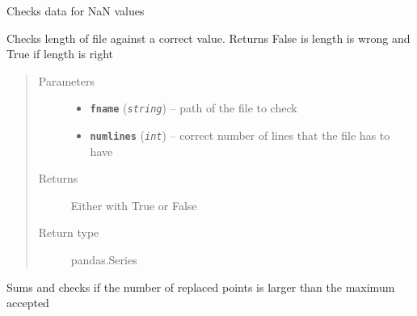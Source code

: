 \documentclass[a4paper,10pt,oneside]{sphinxmanual}
\begin{document}

\begin{fulllineitems}
\label{pymicra:pymicra.tests.check_nans}
Checks data for NaN values

\end{fulllineitems}


\begin{fulllineitems}
\label{pymicra:pymicra.tests.check_numlines}
Checks length of file against a correct value.
Returns False is length is wrong and True if length is right
\begin{quote}\begin{description}
\item[{Parameters}] \leavevmode\begin{itemize}
\item {} 
\textbf{\texttt{fname}} (\emph{\texttt{string}}) -- path of the file to check

\item {} 
\textbf{\texttt{numlines}} (\emph{\texttt{int}}) -- correct number of lines that the file has to have

\end{itemize}

\item[{Returns}] \leavevmode
Either with True or False

\item[{Return type}] \leavevmode
pandas.Series

\end{description}\end{quote}

\end{fulllineitems}


\begin{fulllineitems}
\label{pymicra:pymicra.tests.check_replaced}
Sums and checks if the number of replaced points is larger than the
maximum accepted

\end{fulllineitems}
\end{document}

